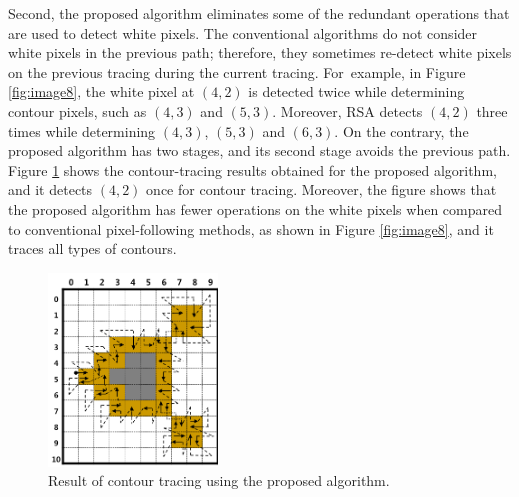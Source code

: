 \documentclass[sensors,article,accept,moreauthors,pdftex,10pt,a4paper]{mdpi}
\begin{document}

Second, the proposed algorithm eliminates some of the redundant operations that are used to detect white pixels. The conventional algorithms do not consider white pixels in the previous path; therefore, they sometimes re-detect white pixels on the previous tracing during the current tracing. For~example, in Figure \ref{fig:image8}, the white pixel at $(4, 2)$ is detected twice while determining contour pixels, such as $(4, 3)$ and $(5, 3)$. Moreover, RSA detects $(4, 2)$ three times while determining $(4, 3)$, $(5, 3)$ and $(6, 3)$. On the contrary, the proposed algorithm has two stages, and its second stage avoids the previous path. Figure \ref{fig:image11} shows the contour-tracing results obtained for the proposed algorithm, and it detects $(4, 2)$ once for contour tracing. Moreover, the figure shows that the proposed algorithm has fewer operations on the white pixels when compared to conventional pixel-following methods, as shown in Figure \ref{fig:image8}, and it traces all types of contours. 

\begin{figure}[H]
	\centering
	\includegraphics[width=0.4\textwidth]{4.Proposed/fig11.png}
	\caption{Result of contour tracing using the proposed algorithm.}
	\label{fig:image11}
\end{figure}
\end{document}
